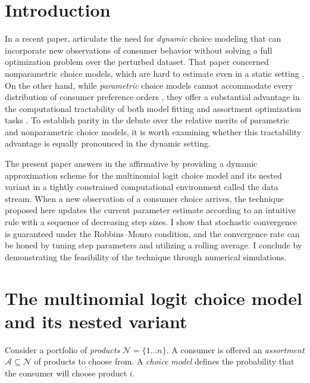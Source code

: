 \documentclass[preprint,12pt,authoryear]{elsarticle}
\begin{document}


\section{Introduction}
In a recent paper, \cite{honguyen2021} articulate the need for \emph{dynamic} choice modeling that can incorporate new observations of consumer behavior without solving a full optimization problem over the perturbed dataset. That paper concerned nonparametric choice models, which are hard to estimate even in a static setting \cite[][]{rusmevichientong2006, farias2013}. On the other hand, while \emph{parametric} choice models cannot accommodate every distribution of consumer preference orders \cite[][]{keane1997}, they offer a substantial advantage in the computational tractability of both model fitting and assortment optimization tasks \cite[][]{bunch1987, davis2014}. To establish parity in the  debate over the relative merits of parametric and nonparametric choice models, it is worth examining whether this tractability advantage is equally pronounced in the dynamic setting. 

The present paper answers in the affirmative by providing a dynamic approximation scheme for the multinomial logit choice model and its nested variant in a tightly constrained computational environment called the data stream. When a new observation of a consumer choice arrives, the technique proposed here updates the current parameter estimate according to an intuitive rule with a sequence of decreasing step sizes. I show that stochastic convergence is guaranteed under the Robbins--Monro condition, and the convergence rate can be honed by tuning step parameters and utilizing a rolling average. I conclude by demonstrating the feasibility of the technique through numerical simulations. 

\section{The multinomial logit choice model and its nested variant}
Consider a portfolio of \emph{products} $\mathcal{N} = \{1 \dots n\}$. A consumer is offered an \emph{assortment} $\mathcal{A} \subseteq \mathcal{N}$ of products to choose from. A \emph{choice model} defines the probability that the consumer will choose product $i$.
\end{document}
